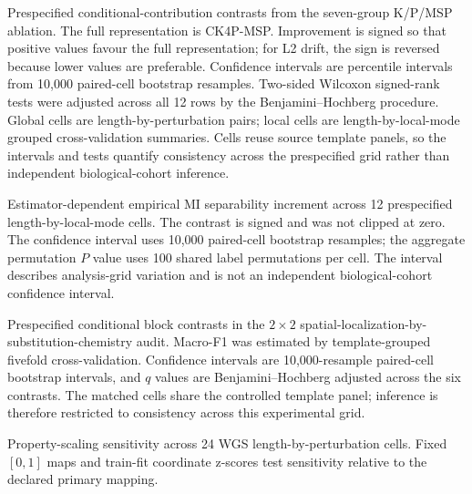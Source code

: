 \documentclass[unnumsec,webpdf,modern,large,numbered]{oup-authoring-template}
\begin{document}
\begin{table}[!tbp]
\centering
\scriptsize
\caption{Prespecified conditional-contribution contrasts from the seven-group K/P/MSP ablation. The full representation is CK4P-MSP. Improvement is signed so that positive values favour the full representation; for L2 drift, the sign is reversed because lower values are preferable. Confidence intervals are percentile intervals from 10,000 paired-cell bootstrap resamples. Two-sided Wilcoxon signed-rank tests were adjusted across all 12 rows by the Benjamini--Hochberg procedure. Global cells are length-by-perturbation pairs; local cells are length-by-local-mode grouped cross-validation summaries. Cells reuse source template panels, so the intervals and tests quantify consistency across the prespecified grid rather than independent biological-cohort inference.}
\label{tab:supps2}
\resizebox{\textwidth}{!}{}
\end{table}

\begin{table}[!tbp]
\centering
\scriptsize
\caption{Estimator-dependent empirical MI separability increment across 12 prespecified length-by-local-mode cells. The contrast is signed and was not clipped at zero. The confidence interval uses 10,000 paired-cell bootstrap resamples; the aggregate permutation $P$ value uses 100 shared label permutations per cell. The interval describes analysis-grid variation and is not an independent biological-cohort confidence interval.}
\label{tab:supps3}
\resizebox{\textwidth}{!}{}
\end{table}

\begin{table}[!tbp]
\centering
\scriptsize
\caption{Prespecified conditional block contrasts in the $2\times2$ spatial-localization-by-substitution-chemistry audit. Macro-F1 was estimated by template-grouped fivefold cross-validation. Confidence intervals are 10,000-resample paired-cell bootstrap intervals, and $q$ values are Benjamini--Hochberg adjusted across the six contrasts. The matched cells share the controlled template panel; inference is therefore restricted to consistency across this experimental grid.}
\label{tab:supps4}
\resizebox{\textwidth}{!}{}
\end{table}

\begin{table}[!tbp]
\centering
\scriptsize
\caption{Property-scaling sensitivity across 24 WGS length-by-perturbation cells. Fixed $[0,1]$ maps and train-fit coordinate z-scores test sensitivity relative to the declared primary mapping.}
\label{tab:supps5}
\resizebox{\textwidth}{!}{}
\end{table}
\end{document}

